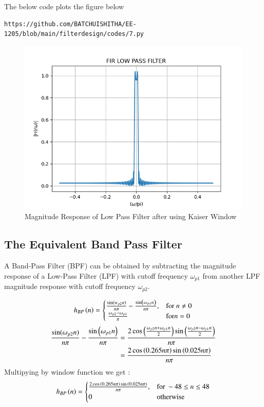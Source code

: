 \documentclass{article}
\begin{document}
The below code plots  the figure below
\begin{lstlisting}
https://github.com/BATCHUISHITHA/EE-1205/blob/main/filterdesign/codes/7.py
\end{lstlisting} 
\begin{figure}[H]
\centering
\includegraphics[width=1\columnwidth]{figs/7.png}
\caption{Magnitude Response of Low Pass Filter after using Kaiser Window}
\label{fig:Kaiser_LPF_response}
\end{figure}

\subsection{The Equivalent Band Pass Filter}
A Band-Pass Filter (BPF) can be obtained by subtracting the magnitude response of a Low-Pass Filter (LPF) with cutoff frequency $\omega_{p1}$ from another LPF magnitude response with cutoff frequency $\omega_{p2}$.

\begin{align}
    h_{BP}\left(n\right) = 
\begin{cases} 
    \frac{\sin(w_{p2} n)}{n\pi} -\frac{\sin\left(\omega_{p1}n\right)}{n\pi},  & \text{for } n\neq 0\\\
    \frac{\omega_{p2}-\omega_{p1}}{\pi} &\text{for} n= 0
\end{cases} \label{eq:h(n)desired_for_LPF1}
\end{align}
\begin{align}
     \frac{\sin(\omega_{p2} n)}{n\pi} -\frac{\sin\left(\omega_{p1}n\right)}{n\pi} &= \frac{2\cos{\ensuremath{\left(\frac{\omega_{p2}n+\omega_{p1}n}{2}\right)}}\sin{\ensuremath{\left(\frac{\omega_{p2}n-\omega_{p1}n}{2}\right)}}}{n \pi}\\
            &= \frac{2\cos{\ensuremath{\left(0.265n\pi\right)}}\sin{\ensuremath{\left(0.025n\pi\right)}}}{n\pi}
\end{align}
Multipying by window function we get :
\begin{align}
    h_{BP}\left(n\right) = 
\begin{cases} 
   \frac{2\cos{\ensuremath{\left(0.265n\pi\right)}}\sin{\ensuremath{\left(0.025n\pi\right)}}}{n\pi},  & \text{for } -48\leq n \leq 48 \\
    0 &\text{otherwise}
\end{cases} \label{eq:h(n)desired_for_LPF2}
\end{align}
\end{document}
